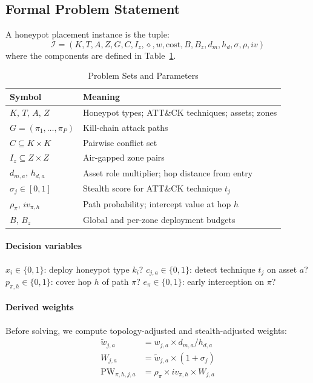 \documentclass[journal]{IEEEtran}
\begin{document}
\subsection{Formal Problem Statement}

A honeypot placement instance is the tuple:
\begin{equation}
  \mathcal{I} = (K,T,A,Z,G,C,I_z,\diamond,w,\mathrm{cost},B,B_z,
                 d_m,h_d,\sigma,\rho,iv)
  \label{eq:instance}
\end{equation}
where the components are defined in Table~\ref{tab:symbols}.

\begin{table}[t]
\caption{Problem Sets and Parameters}
\label{tab:symbols}
\centering
\renewcommand{\arraystretch}{1.2}
\begin{tabular}{ll}
\toprule
Symbol & Meaning \\
\midrule
$K,\,T,\,A,\,Z$ & Honeypot types; ATT\&CK techniques; assets; zones \\
$G=(\pi_1,\dots,\pi_P)$ & Kill-chain attack paths \\
$C\subseteq K\times K$ & Pairwise conflict set \\
$I_z\subseteq Z\times Z$ & Air-gapped zone pairs \\
$d_{m,a},\,h_{d,a}$ & Asset role multiplier; hop distance from entry \\
$\sigma_j\in[0,1]$ & Stealth score for ATT\&CK technique $t_j$ \\
$\rho_\pi,\,iv_{\pi,h}$ & Path probability; intercept value at hop $h$ \\
$B,\,B_z$ & Global and per-zone deployment budgets \\
\bottomrule
\end{tabular}
\end{table}

\paragraph{Decision variables}
$x_i\in\{0,1\}$: deploy honeypot type $k_i$?
$c_{j,a}\in\{0,1\}$: detect technique $t_j$ on asset $a$?
$p_{\pi,h}\in\{0,1\}$: cover hop $h$ of path $\pi$?
$e_\pi\in\{0,1\}$: early interception on $\pi$?

\paragraph{Derived weights}
Before solving, we compute topology-adjusted and stealth-adjusted
weights:
\begin{align}
  \tilde{w}_{j,a} &= w_{j,a}\times d_{m,a}/h_{d,a}
  \label{eq:topo}\\
  W_{j,a} &= \tilde{w}_{j,a}\times(1+\sigma_j)
  \label{eq:stealth}\\
  \mathrm{PW}_{\pi,h,j,a} &= \rho_\pi\times iv_{\pi,h}\times W_{j,a}
  \label{eq:pathweight}
\end{align}
\end{document}
